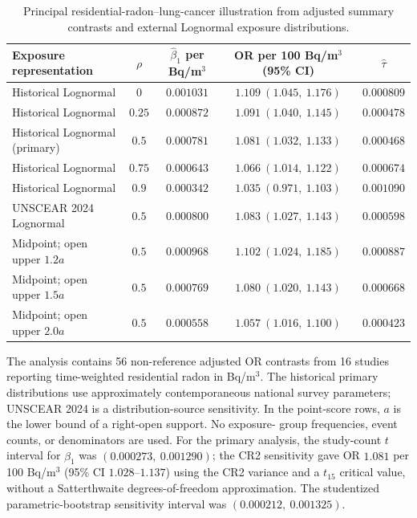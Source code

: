 \documentclass[journal=rsm]{CUP-JNL-DTM}%
\theoremstyle{definition}
\numberwithin{equation}{section}
\begin{document}
\begin{table}[htbp]
\centering
\caption{Principal residential-radon--lung-cancer illustration from adjusted summary contrasts and external Lognormal exposure distributions.}
\label{tab:radon_example}
\small
\setlength{\tabcolsep}{4pt}
\begin{tabular}{lcccc}
\toprule
Exposure representation & $\rho$ & $\hat\beta_1$ per Bq/m$^3$ & OR per 100 Bq/m$^3$ (95\% CI) & $\hat\tau$ \\
\midrule
Historical Lognormal & $0$ & $0.001031$ & $1.109\ (1.045,\ 1.176)$ & $0.000809$ \\
Historical Lognormal & $0.25$ & $0.000872$ & $1.091\ (1.040,\ 1.145)$ & $0.000478$ \\
Historical Lognormal (primary) & $0.5$ & $0.000781$ & $1.081\ (1.032,\ 1.133)$ & $0.000468$ \\
Historical Lognormal & $0.75$ & $0.000643$ & $1.066\ (1.014,\ 1.122)$ & $0.000674$ \\
Historical Lognormal & $0.9$ & $0.000342$ & $1.035\ (0.971,\ 1.103)$ & $0.001090$ \\
UNSCEAR 2024 Lognormal & $0.5$ & $0.000800$ & $1.083\ (1.027,\ 1.143)$ & $0.000598$ \\
Midpoint; open upper $1.2a$ & $0.5$ & $0.000968$ & $1.102\ (1.024,\ 1.185)$ & $0.000887$ \\
Midpoint; open upper $1.5a$ & $0.5$ & $0.000769$ & $1.080\ (1.020,\ 1.143)$ & $0.000668$ \\
Midpoint; open upper $2.0a$ & $0.5$ & $0.000558$ & $1.057\ (1.016,\ 1.100)$ & $0.000423$ \\
\bottomrule
\end{tabular}
\par\smallskip
\begin{minipage}{0.96\textwidth}
\footnotesize The analysis contains 56 non-reference adjusted OR contrasts
from 16 studies reporting time-weighted residential radon in Bq/m$^3$. The
historical primary distributions use approximately contemporaneous national
survey parameters; UNSCEAR 2024 is a distribution-source sensitivity. In the
point-score rows, $a$ is the lower bound of a right-open support. No exposure-
group frequencies, event counts, or denominators are used. For the primary
analysis, the study-count $t$ interval for $\hat\beta_1$ was
$(0.000273,\ 0.001290)$; the CR2 sensitivity gave OR $1.081$ per 100
Bq/m$^3$ (95\% CI $1.028$--$1.137$) using the CR2 variance and a $t_{15}$
critical value, without a Satterthwaite degrees-of-freedom approximation. The studentized parametric-bootstrap
sensitivity interval was $(0.000212,\ 0.001325)$.
\end{minipage}
\end{table}
\end{document}
